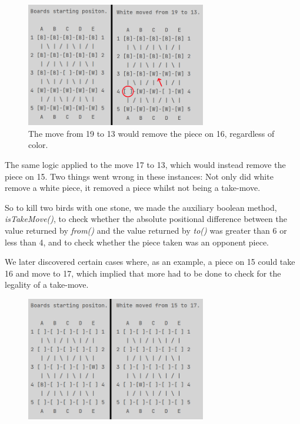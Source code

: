 \documentclass[12pt, a4paper]{article}
\begin{document}
\begin{figure}[h]
	\caption*{The move from 19 to 13 would remove the piece on 16, regardless of color.}
	\centering
	\includegraphics[width=0.7\textwidth]{19til13TakeFejl.png}	
\end{figure}

The same logic applied to the move 17 to 13, which would instead remove the piece on 15. 
Two things went wrong in these instances: Not only did white remove a white piece, it removed a piece whilst not being a take-move. \par So to kill two birds with one stone, we made the auxiliary boolean method, \emph{isTakeMove()}, to check whether the absolute positional difference between the value returned by \emph{from()} and the value returned by \emph{to()} was greater than 6 or less than 4, and to check whether the piece taken was an opponent piece. \par 
We later discovered certain cases where, as an example, a piece on 15 could take 16 and move to 17, which implied that more had to be done to check for the legality of a take-move. \par

\begin{figure}[h]
	\centering
	\includegraphics[width=0.7\textwidth]{15til17TakeFejl.png}	
\end{figure}
\end{document}
